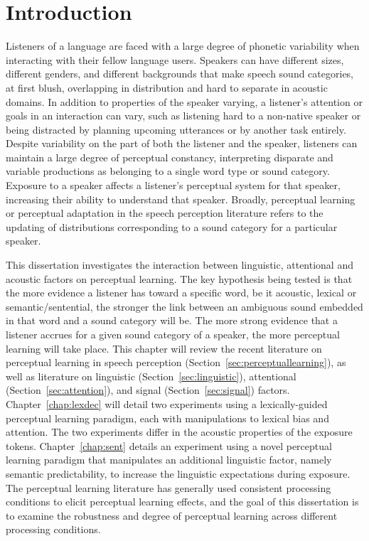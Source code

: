 
\chapter{Introduction}

Listeners of a language are faced with a large degree of phonetic variability when interacting with their fellow language users.  
Speakers can have different sizes, different genders, and different backgrounds that make speech sound categories, at first blush, overlapping in distribution and hard to separate in acoustic domains.
In addition to properties of the speaker varying, a listener's attention or goals in an interaction can vary, such as listening hard to a non-native speaker or being distracted by planning upcoming utterances or by another task entirely.  
Despite variability on the part of both the listener and the speaker, listeners can maintain a large degree of perceptual constancy, interpreting disparate and variable productions as belonging to a single word type or sound category.
Exposure to a speaker affects a listener's perceptual system for that speaker, increasing their ability to understand that speaker.
Broadly, perceptual learning or perceptual adaptation in the speech perception literature refers to the updating of distributions corresponding to a sound category for a particular speaker.

This dissertation investigates the interaction between linguistic, attentional and acoustic factors on perceptual learning.
The key hypothesis being tested is that the more evidence a listener has toward a specific word, be it acoustic, lexical or semantic/sentential, the stronger the link between an ambiguous sound embedded in that word and a sound category will be.
The more strong evidence that a listener accrues for a given sound category of a speaker, the more perceptual learning will take place.
This chapter will review the recent literature on perceptual learning in speech perception (Section~\ref{sec:perceptuallearning}), as well as literature on linguistic  (Section~\ref{sec:linguistic}), attentional (Section~\ref{sec:attention}), and signal (Section~\ref{sec:signal}) factors.
Chapter~\ref{chap:lexdec} will detail two experiments using a lexically-guided perceptual learning paradigm, each with manipulations to lexical bias and attention.  The two experiments differ in the acoustic properties of the exposure tokens.  Chapter~\ref{chap:sent} details an experiment using a novel perceptual learning paradigm that manipulates an additional linguistic factor, namely semantic predictability, to increase the linguistic expectations during exposure.
The perceptual learning literature has generally used consistent processing conditions to elicit perceptual learning effects, and the goal of this dissertation is to examine the robustness and degree of perceptual learning across different processing conditions.

